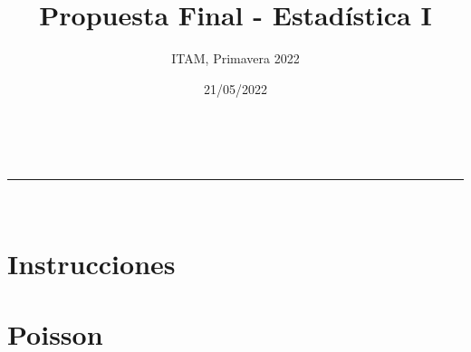 \documentclass[addpoints]{exam}
\makeatletter
\newcommand{\linia}{\rule{\linewidth}{0.5pt}}
\theoremstyle{mytheor}
\renewcommand{\maketitle}{
    \begin{center}
    \vspace{2ex}
    {\huge \textsc{\@title}}
    \vspace{1ex}
    \\
    \linia\\
    \@author \hfill \@date
    \vspace{4ex}
    \end{center}
  }
\makeatother
\begin{document}
  
  \title{Propuesta Final - Estadística I}
  
  \author{ITAM, Primavera 2022}
  
  \date{21/05/2022}
  
  \maketitle
  
  \section*{Instrucciones}
  
\vspace{10pt}
  

  
  \section*{Poisson}
  
\end{document}

